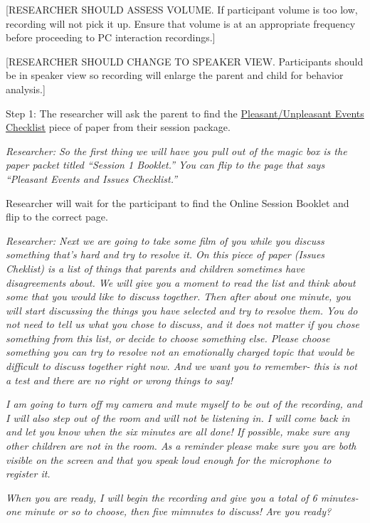 \documentclass[]{book}
\begin{document}
{[}RESEARCHER SHOULD ASSESS VOLUME. If participant volume is too low, recording will not pick it up. Ensure that volume is at an appropriate frequency before proceeding to PC interaction recordings.{]}

{[}RESEARCHER SHOULD CHANGE TO SPEAKER VIEW. Participants should be in speaker view so recording will enlarge the parent and child for behavior analysis.{]}

Step 1:
The researcher will ask the parent to find the \href{https://ucla.app.box.com/file/630327764749}{Pleasant/Unpleasant Events Checklist} piece of paper from their session package.

\emph{Researcher: So the first thing we will have you pull out of the magic box is the paper packet titled ``Session 1 Booklet.'' You can flip to the page that says ``Pleasant Events and Issues Checklist.''}

Researcher will wait for the participant to find the Online Session Booklet and flip to the correct page.

\emph{Researcher: Next we are going to take some film of you while you discuss something that's hard and try to resolve it. On this piece of paper (Issues Cheklist) is a list of things that parents and children sometimes have disagreements about. We will give you a moment to read the list and think about some that you would like to discuss together. Then after about one minute, you will start discussing the things you have selected and try to resolve them. You do not need to tell us what you chose to discuss, and it does not matter if you chose something from this list, or decide to choose something else. Please choose something you can try to resolve not an emotionally charged topic that would be difficult to discuss together right now. And we want you to remember- this is not a test and there are no right or wrong things to say!}

\emph{I am going to turn off my camera and mute myself to be out of the recording, and I will also step out of the room and will not be listening in. I will come back in and let you know when the six minutes are all done! If possible, make sure any other children are not in the room. As a reminder please make sure you are both visible on the screen and that you speak loud enough for the microphone to register it.}

\emph{When you are ready, I will begin the recording and give you a total of 6 minutes- one minute or so to choose, then five mimnutes to discuss! Are you ready?}
\end{document}
